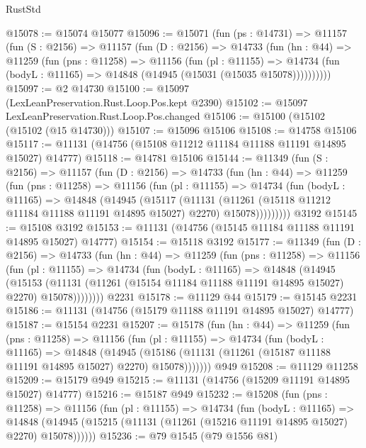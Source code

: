 \begin{lexlean}{RustStd}
\begin{coremodule}
@15078 := @15074 @15077
@15096 := @15071
    (fun (ps : @14731) =>
    @11157
      (fun (S : @2156) =>
      @11157
        (fun (D : @2156) =>
        @14733
          (fun (hn : @44) =>
          @11259
            (fun (pns : @11258) =>
            @11156
              (fun (pl : @11155) =>
              @14734 (fun (bodyL : @11165) => @14848 (@14945 (@15031 (@15035 @15078))))))))))
@15097 := @2 @14730
@15100 := @15097 (LexLeanPreservation.Rust.Loop.Pos.kept @2390)
@15102 := @15097 LexLeanPreservation.Rust.Loop.Pos.changed
@15106 := @15100 (@15102 (@15102 (@15 @14730)))
@15107 := @15096 @15106
@15108 := @14758 @15106
@15117 := @11131 (@14756 (@15108 @11212 @11184 @11188 @11191 @14895 @15027) @14777)
@15118 := @14781 @15106
@15144 := @11349
    (fun (S : @2156) =>
    @11157
      (fun (D : @2156) =>
      @14733
        (fun (hn : @44) =>
        @11259
          (fun (pns : @11258) =>
          @11156
            (fun (pl : @11155) =>
            @14734
              (fun (bodyL : @11165) =>
              @14848
                (@14945
                  (@15117
                    (@11131
                      (@11261 (@15118 @11212 @11184 @11188 @11191 @14895 @15027) @2270)
                      @15078)))))))))
    @3192
@15145 := @15108 @3192
@15153 := @11131 (@14756 (@15145 @11184 @11188 @11191 @14895 @15027) @14777)
@15154 := @15118 @3192
@15177 := @11349
    (fun (D : @2156) =>
    @14733
      (fun (hn : @44) =>
      @11259
        (fun (pns : @11258) =>
        @11156
          (fun (pl : @11155) =>
          @14734
            (fun (bodyL : @11165) =>
            @14848
              (@14945
                (@15153
                  (@11131 (@11261 (@15154 @11184 @11188 @11191 @14895 @15027) @2270) @15078))))))))
    @2231
@15178 := @11129 @44
@15179 := @15145 @2231
@15186 := @11131 (@14756 (@15179 @11188 @11191 @14895 @15027) @14777)
@15187 := @15154 @2231
@15207 := @15178
    (fun (hn : @44) =>
    @11259
      (fun (pns : @11258) =>
      @11156
        (fun (pl : @11155) =>
        @14734
          (fun (bodyL : @11165) =>
          @14848
            (@14945
              (@15186 (@11131 (@11261 (@15187 @11188 @11191 @14895 @15027) @2270) @15078)))))))
    @949
@15208 := @11129 @11258
@15209 := @15179 @949
@15215 := @11131 (@14756 (@15209 @11191 @14895 @15027) @14777)
@15216 := @15187 @949
@15232 := @15208
    (fun (pns : @11258) =>
    @11156
      (fun (pl : @11155) =>
      @14734
        (fun (bodyL : @11165) =>
        @14848 (@14945 (@15215 (@11131 (@11261 (@15216 @11191 @14895 @15027) @2270) @15078))))))
@15236 := @79 @1545 (@79 @1556 @81)

\end{coremodule}
\end{lexlean}
